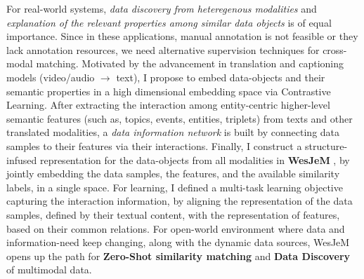 For real-world systems, \textit{data discovery 
from heteregenous modalities}
and \textit{explanation of the relevant properties among similar data objects} is of equal importance. 
Since in these applications, manual annotation is not feasible or they lack annotation resources, we need alternative supervision techniques for cross-modal matching. 
%
Motivated by the advancement in translation and captioning models (video/audio $\rightarrow$ text), I propose to embed data-objects and their semantic properties in a high dimensional embedding space via Contrastive Learning. 
After extracting the interaction among entity-centric higher-level semantic features (such as, topics, events, entities, triplets) from texts and other translated modalities, a \textit{data information network} is built by connecting data samples to
their features via their interactions.
Finally, I construct a structure-infused representation for the data-objects from all modalities in \textbf{WesJeM} \cite{solaiman2022open}, by jointly embedding the data samples, the features, and the available similarity labels, 
in a single space.
%
For learning, I defined a multi-task learning objective capturing the interaction information,
by aligning the
representation of the data samples, defined by their textual content, with the representation of features, based on their common relations. 
%
For open-world environment where data and information-need keep changing, along with the dynamic data sources, WesJeM opens up the path for \textbf{Zero-Shot similarity matching} and \textbf{Data Discovery} of multimodal data.
